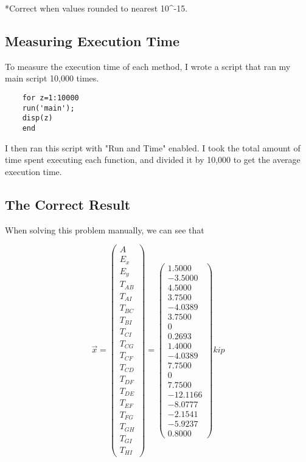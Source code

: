 \documentclass[9pt,letterpaper]{article}
\begin{document}
    \small{*Correct when values rounded to nearest 10\^{}-15.}
    \subsection{Measuring Execution Time}
    
    To measure the execution time of each method, I wrote a script that ran my main script 10,000 times.
    
    \begin{verbatim}
    for z=1:10000
    run('main');
    disp(z)
    end
    \end{verbatim}
    
    I then ran this script with "Run and Time" enabled. I took the total amount of time spent executing each function, and divided it by 10,000 to get the average execution time.
	\subsection{The Correct Result}
	When solving this problem manually, we can see that
	
	\[ \vec{x}=\left(\begin{array}{cccccccccccccccccc} A \\ E_x \\ E_y \\ T_{AB} \\ T_{AI} \\ T_{BC} \\ T_{BI} \\ T_{CI} \\ T_{CG} \\ T_{CF} \\ T_{CD} \\ T_{DF} \\ T_{DE} \\ T_{EF} \\ T_{FG} \\ T_{GH} \\ T_{GI} \\ T_{HI}  \end{array} \right) =\left(\begin{array}{c} 1.5000\\ -3.5000\\ 4.5000\\ 3.7500\\ -4.0389\\ 3.7500\\ 0\\ 0.2693\\ 1.4000\\ -4.0389\\ 7.7500\\ 0\\ 7.7500\\ -12.1166\\ -8.0777\\ -2.1541\\ -5.9237\\ 0.8000 \end{array}\right) kip\]
	
\end{document}
